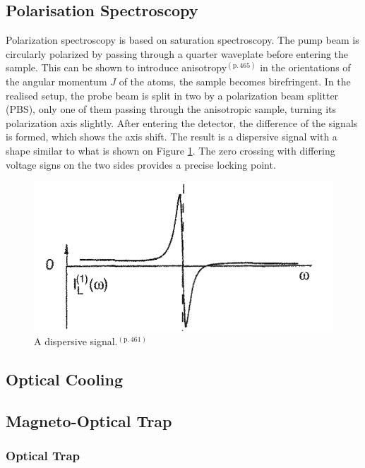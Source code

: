 \documentclass[twocolumn]{article}
\begin{document}
\subsection{Polarisation Spectroscopy}%
Polarization spectroscopy is based on saturation spectroscopy. The pump beam is circularly polarized by passing through a quarter waveplate before entering the sample. This can be shown to introduce anisotropy\cite{demtroder}$^{(\text{p.}\,465)}$ in the orientations of the angular momentum $J$ of the atoms, the sample becomes birefringent.
In the realised setup, the probe beam is split in two by a polarization beam splitter (PBS),
only one of them passing through the anisotropic sample, turning its polarization axis slightly. After entering the detector, the difference of the signals is formed, which shows the axis shift. The result is a dispersive signal with a shape similar to what is shown on Figure \ref{fig:Dispersive}. The zero crossing with differing voltage signs on the two sides provides a precise locking point.
\begin{figure}
\centering
\includegraphics[scale=0.3]{Images/Dispersive.png}
\caption{A dispersive signal.\cite{demtroder}$^{(\text{p.}\,461)}$}
\label{fig:Dispersive}
\end{figure}
\subsection{Optical Cooling}

\subsection{Magneto-Optical Trap}
\subsubsection{Optical Trap}
\end{document}
